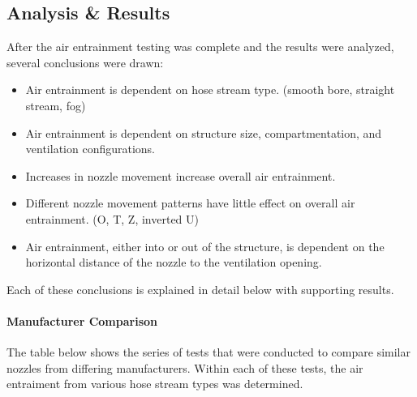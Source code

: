 \documentclass{article}
\begin{document}
\clearpage

\subsection{Analysis \& Results}

\vspace*{\baselineskip}

After the air entrainment testing was complete and the results were analyzed, several conclusions were drawn:

\begin{itemize}
	\item Air entrainment is dependent on hose stream type. (smooth bore, straight stream, fog)
	\item Air entrainment is dependent on structure size, compartmentation, and ventilation configurations.
	\item Increases in nozzle movement increase overall air entrainment.
	\item Different nozzle movement patterns have little effect on overall air entrainment. (O, T, Z, inverted U)
	\item Air entrainment, either into or out of the structure, is dependent on the horizontal distance of the nozzle to the ventilation opening.
\end{itemize}

Each of these conclusions is explained in detail below with supporting results.

\paragraph{Manufacturer Comparison}

\vspace*{\baselineskip}

The table below shows the series of tests that were conducted to compare similar nozzles from differing manufacturers. Within each of these tests, the air entraiment from various hose stream types was determined.

\vspace*{\baselineskip}
\end{document}
